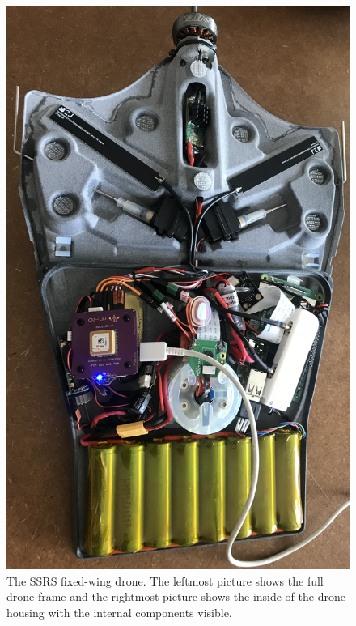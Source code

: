 \documentclass[nofilelist]{cslthse-msc}
\begin{document}
\begin{figure}[htp]
   \centering
   \includegraphics[width=.35\textwidth]{images/fv-1.jpg}
   \caption{The SSRS fixed-wing drone. The leftmost picture shows the full drone frame and the rightmost picture shows the inside of the drone housing with the internal components visible.}
   \label{fig:fv-drone-pics}
\end{figure}
\end{document}
